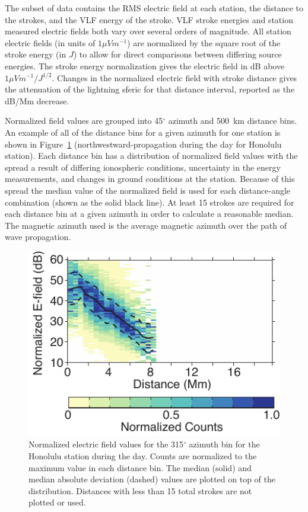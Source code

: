The subset of data contains the RMS electric field at each station, the distance to the strokes, and the VLF energy of the stroke.
VLF stroke energies and station measured electric fields both vary over several orders of magnitude.
All station electric fields (in units of $1 \mu V m^{-1}$) are normalized by the square root of the stroke energy (in $J$) to allow for direct comparisons between differing source energies.
The stroke energy normalization gives the electric field in dB above $1 \mu Vm^{-1}/J^{1/2}$.
Changes in the normalized electric field with stroke distance gives the attenuation of the lightning sferic for that distance interval, reported as the dB/Mm decrease. 

Normalized field values are grouped into 45$^\circ$ azimuth and 500~km distance bins.
An example of all of the distance bins for a given azimuth for one station is shown in Figure~\ref{azimuth:fig:azimuthCalculation} (northwestward-propagation during the day for Honolulu station).
Each distance bin has a distribution of normalized field values with the spread a result of differing ionospheric conditions, uncertainty in the energy measurements, and changes in ground conditions at the station.
Because of this spread the median value of the normalized field is used for each distance-angle combination (shown as the solid black line).
At least 15 strokes are required for each distance bin at a given azimuth in order to calculate a reasonable median.
The magnetic azimuth used is the average magnetic azimuth over the path of wave propagation.

 \begin{figure}[h!t]
   \centering
   \includegraphics[scale=1]{Azimuth/Figures/azimuthCalculation.pdf} 
   \caption{Normalized electric field values for the 315$^\circ$ azimuth bin for the Honolulu station during the day.
   	Counts are normalized to the maximum value in each distance bin.
	The median (solid) and median absolute deviation (dashed) values are plotted on top of the distribution.
	Distances with less than 15 total strokes are not plotted or used.}
   \label{azimuth:fig:azimuthCalculation}
\end{figure}

